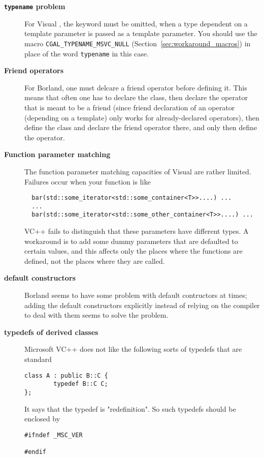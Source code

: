 \begin{description}
\item[\textbf{{\tt typename} problem}]
For Visual \CC, the keyword  must be omitted, when
a type dependent on a template parameter is passed as a template parameter. 
You should use the macro \texttt{CGAL\_TYPENAME\_MSVC\_NULL} 
(Section~\ref{sec:workaround_macros}) in place of the word \texttt{typename} 
in this case.

\item[\textbf{Friend operators}]

For Borland, one must delcare a friend operator before defining it.
This means that often one has to declare the class,
then declare the operator that is meant to be a friend
(since friend declaration of an operator (depending on a template) only 
works for already-declared operators),
then define the class and declare the friend operator there,
and only then define the operator.

\item[\textbf{Function parameter matching}]

The function parameter matching capacities of Visual \CC are rather limited. 
Failures occur when your function  is like
\begin{verbatim}
  bar(std::some_iterator<std::some_container<T>>....) ...
  ...
  bar(std::some_iterator<std::some_other_container<T>>....) ...
\end{verbatim}
VC++ fails to distinguish that these parameters have different types.
A workaround is to add some dummy parameters that are defaulted to
certain values, and this affects only the places where the functions
are defined, not the places where they are called.


%
\item[\textbf{default constructors}]

Borland seems to have some problem with default contructors at times;
adding the default constructors explicitly instead of relying on the
compiler to deal with them seems to solve the problem.

\item[\textbf{typedefs of derived classes}]
Microsoft VC++ does not like the following sorts of typedefs that are 
standard
\begin{verbatim}
class A : public B::C {
        typedef B::C C;
};
\end{verbatim}
It says that the typedef is "redefinition".  So such typedefs should be 
enclosed by
\begin{verbatim}
#ifndef _MSC_VER

#endif
\end{verbatim}
\end{description}

